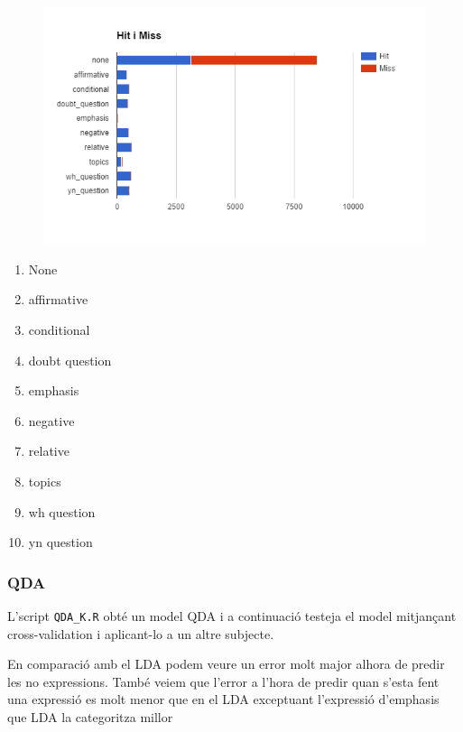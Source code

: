 \documentclass[a4paper]{article}
\begin{document}
\begin{figure}[H]
	\centering
	\includegraphics[width=\textwidth]{images/image01}
\end{figure}

\begin{multicols}{3}
	\begin{enumerate}
		\item None 
		\item affirmative 
		\item conditional 
		\item doubt question 
		\item emphasis 
		\item negative 
		\item relative 
		\item topics 
		\item wh question 
		\item yn question
	\end{enumerate}
\end{multicols}

\subsubsection{QDA}
L’script \verb|QDA_K.R|  obté un model QDA i a continuació testeja el model mitjançant cross-validation i aplicant-lo a un altre subjecte.


En comparació amb el LDA podem veure un error molt major alhora de predir les no expressions. També veiem que l’error a l’hora de predir quan s’esta fent una expressió es molt menor que en el LDA exceptuant l’expressió d’emphasis que LDA la categoritza millor
\end{document}
